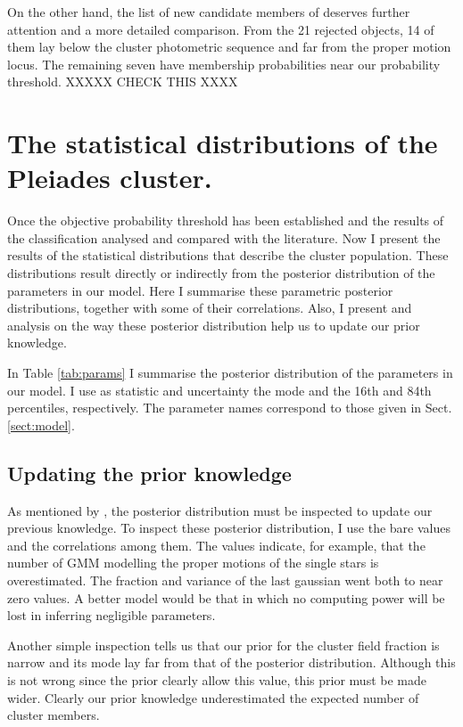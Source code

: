 On the other hand, the list of new candidate members of \citet{Stauffer2007} deserves further attention and a more detailed comparison.
From the 21 rejected objects, 14 of them lay below the cluster photometric sequence and  far from the proper motion locus. The remaining seven have membership probabilities near our probability threshold. XXXXX CHECK THIS XXXX 
 
\section{The statistical distributions of the Pleiades cluster.}
Once the objective probability threshold has been established and the results of the classification analysed and compared with the literature. Now I present the results of the statistical distributions that describe the cluster population. These distributions result directly or indirectly from the posterior distribution of the parameters in our model. Here I summarise these parametric posterior distributions, together with some of their correlations. Also, I present and analysis on the way these posterior distribution help us to update our prior knowledge.

In Table \ref{tab:params} I summarise the posterior distribution of the parameters in our model. I use as statistic and uncertainty the mode and the 16th and 84th percentiles, respectively. The parameter names correspond to those given in Sect. \ref{sect:model}. 

%

\subsection{Updating the prior knowledge}
As mentioned by \citet{Gelman2006}, the posterior distribution must be inspected to update our previous knowledge. To inspect these posterior distribution, I use the bare values and the correlations among them. The values indicate, for example, that the number of  GMM modelling the proper motions of the single stars is overestimated. The fraction and variance of the last gaussian went both to near zero values. A better model would be that in which no computing power will be lost in inferring negligible parameters.

Another simple inspection tells us that our prior for the cluster field fraction is narrow and its mode lay far from that of the posterior distribution. Although this is not wrong since the prior clearly allow this value, this prior must be made wider.  Clearly our prior knowledge underestimated the expected number of cluster members.   

